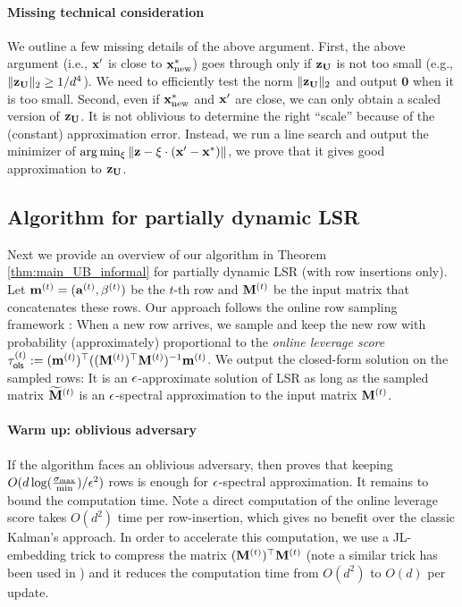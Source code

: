 \paragraph{Missing technical consideration} We outline a few missing details of the above argument. First, the above argument (i.e., $\mathbf{x}'$ is close to $\mathbf{x}^{*}_{\operatorname{new}}$) goes through only if $\mathbf{z}_{\mathbf{U}}$ is not too small (e.g., $\|\mathbf{z}_{\mathbf{U}}\|_2 \geq 1/d^4$). We need to efficiently test the norm $\|\mathbf{z}_{\mathbf{U}}\|_2$ and output $\mathbf{0}$ when it is too small. 
Second, even if $\mathbf{x}_{\operatorname{new}}^{*}$ and $\mathbf{x}'$ are close, we can only obtain a scaled version of $\mathbf{z}_{\mathbf{U}}$. It is not oblivious to determine the right ``scale'' because of the (constant) approximation error. Instead, we run a line search and output the minimizer of $\arg\min_{\xi}\|\mathbf{z} - \xi\cdot(\mathbf{x}' - \mathbf{x}^{*})\|$, we prove that it gives good approximation to $\mathbf{z}_{\mathbf{U}}$.


\subsection{Algorithm for partially dynamic LSR}
Next we provide an overview of our algorithm in Theorem \ref{thm:main_UB_informal} for partially dynamic LSR (with row insertions only). 
Let $\mathbf{m}^{(t)} = (\mathbf{a}^{(t)}, \beta^{(t)})$ be the $t$-th row and $\mathbf{M}^{(t)}$ be the input matrix that concatenates these rows.
Our approach follows the online row sampling framework \cite{clmmps15, cmp20, bdm+20}: 
When a new row arrives, we sample and keep the new row with probability (approximately) proportional to the {\em online leverage score} $\tau_{\mathsf{ols}}^{(t)}:= (\mathbf{m}^{(t)})^\top ((\mathbf{M}^{(t)})^{\top} \mathbf{M}^{(t)})^{-1}\mathbf{m}^{(t)}$. 
We output the closed-form solution on the sampled rows: It is an $\epsilon$-approximate solution of LSR as long as the sampled matrix $\widetilde{\mathbf{M}}^{(t)}$ is an $\epsilon$-spectral approximation to the input matrix $\mathbf{M}^{(t)}$.


\paragraph{Warm up: oblivious adversary}
If the algorithm faces an oblivious adversary, then \cite{cmp20} proves that keeping $O(d\log(\frac{\sigma_{\max}}{\min})/\epsilon^2)$ rows is enough for  $\epsilon$-spectral approximation.
It remains to bound the computation time.
Note a direct computation of the online leverage score takes $O(d^2)$ time per row-insertion, which gives no benefit over the classic Kalman's approach. In order to accelerate this computation, we use a JL-embedding trick to compress the matrix $(\mathbf{M}^{(t)})^\top\mathbf{M}^{(t)}$ (note a similar trick has been used in \cite{ss11, blss20}) and it reduces the computation time from $O(d^2)$ to $O(d)$ per update. 






